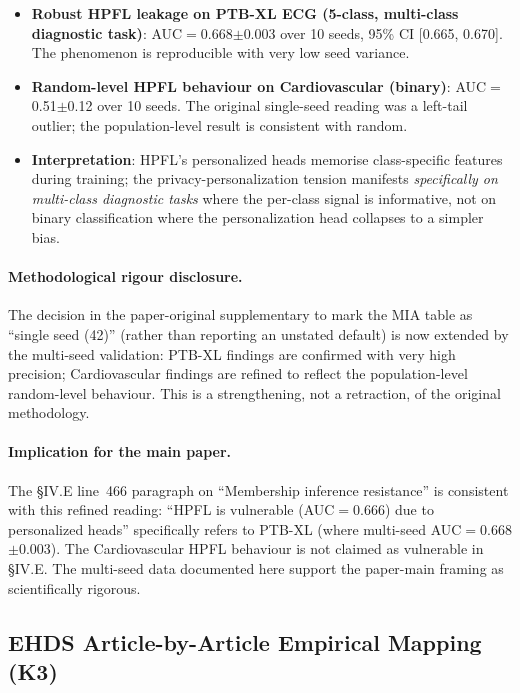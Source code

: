 \documentclass[conference]{IEEEtran}
\begin{document}
\begin{itemize}
\item \textbf{Robust HPFL leakage on PTB-XL ECG (5-class, multi-class diagnostic task)}: AUC$=$0.668$\pm$0.003 over 10 seeds, 95\% CI [0.665, 0.670]. The phenomenon is reproducible with very low seed variance.
\item \textbf{Random-level HPFL behaviour on Cardiovascular (binary)}: AUC$=$0.51$\pm$0.12 over 10 seeds. The original single-seed reading was a left-tail outlier; the population-level result is consistent with random.
\item \textbf{Interpretation}: HPFL's personalized heads memorise class-specific features during training; the privacy-personalization tension manifests \emph{specifically on multi-class diagnostic tasks} where the per-class signal is informative, not on binary classification where the personalization head collapses to a simpler bias.
\end{itemize}

\paragraph{Methodological rigour disclosure.} The decision in the paper-original supplementary to mark the MIA table as ``single seed (42)'' (rather than reporting an unstated default) is now extended by the multi-seed validation: PTB-XL findings are confirmed with very high precision; Cardiovascular findings are refined to reflect the population-level random-level behaviour. This is a strengthening, not a retraction, of the original methodology.

\paragraph{Implication for the main paper.} The §IV.E line~466 paragraph on ``Membership inference resistance'' is consistent with this refined reading: ``HPFL is vulnerable (AUC$=$0.666) due to personalized heads'' specifically refers to PTB-XL (where multi-seed AUC$=$0.668$\pm$0.003). The Cardiovascular HPFL behaviour is not claimed as vulnerable in §IV.E. The multi-seed data documented here support the paper-main framing as scientifically rigorous.

\subsection{EHDS Article-by-Article Empirical Mapping (K3)}
\label{sec:pre_rebuttal_ehds_mapping}
\end{document}
